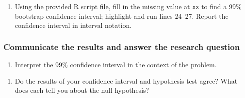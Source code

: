 \documentclass[
]{report}
\newenvironment{Shaded}{\begin{snugshade}}{\end{snugshade}}
\newcommand{\AttributeTok}[1]{\textcolor[rgb]{0.77,0.63,0.00}{#1}}
\newcommand{\CommentTok}[1]{\textcolor[rgb]{0.56,0.35,0.01}{\textit{#1}}}
\newcommand{\DecValTok}[1]{\textcolor[rgb]{0.00,0.00,0.81}{#1}}
\newcommand{\FunctionTok}[1]{\textcolor[rgb]{0.00,0.00,0.00}{#1}}
\newcommand{\NormalTok}[1]{#1}
\newcommand{\SpecialCharTok}[1]{\textcolor[rgb]{0.00,0.00,0.00}{#1}}
\providecommand{\tightlist}{%
  \setlength{\itemsep}{0pt}\setlength{\parskip}{0pt}}
\begin{document}
\vspace{0.8in}

\begin{enumerate}
\def\labelenumi{\arabic{enumi}.}
\setcounter{enumi}{16}
\tightlist
\item
  Using the provided R script file, fill in the missing value at \texttt{xx} to find a 99\% bootstrap confidence interval; highlight and run lines 24--27. Report the confidence interval in interval notation.
\end{enumerate}

\begin{Shaded}
\end{Shaded}

\vspace{.5in}

\hypertarget{communicate-the-results-and-answer-the-research-question-2}{%
\subsubsection*{Communicate the results and answer the research question}\label{communicate-the-results-and-answer-the-research-question-2}}

\begin{enumerate}
\def\labelenumi{\arabic{enumi}.}
\setcounter{enumi}{17}
\tightlist
\item
  Interpret the 99\% confidence interval in the context of the problem.
\end{enumerate}

\vspace{0.7in}

\begin{enumerate}
\def\labelenumi{\arabic{enumi}.}
\setcounter{enumi}{18}
\tightlist
\item
  Do the results of your confidence interval and hypothesis test agree? What does each tell you about the null hypothesis?
\end{enumerate}
\end{document}

